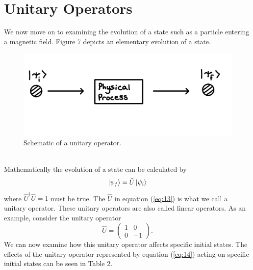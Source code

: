 \documentclass[twocolumn]{article}
\begin{document}
\section*{Unitary Operators}
We now move on to examining the evolution of a state such as a particle entering a magnetic field. Figure 7 depicts an elementary evolution of a state.
\begin{figure}[htpb]
\begin{center}
\includegraphics[width=0.90\linewidth]{Unitary-Operator.PNG}
\caption{Schematic of a unitary operator.}
\end{center}
\end{figure}\\
Mathematically the evolution of a state can be calculated by
\begin{equation}\label{eq:13}
\ket{\psi_f}=\hat{U}\ket{\psi_i}
\end{equation}
where $\hat{U}^{\dagger}\hat{U}=1$ must be true. The $\hat{U}$ in equation (\ref{eq:13}) is what we call a unitary operator. These unitary operators are also called linear operators. As an example, consider the unitary operator
\begin{equation}\label{eq:14}
\hat{U}=
\begin{pmatrix}
1 & 0 \\
0 & -1
\end{pmatrix}.
\end{equation}
We can now examine how this unitary operator affects specific initial states. The effects of the unitary operator represented by equation (\ref{eq:14}) acting on specific initial states can be seen in Table 2. 
\end{document}
